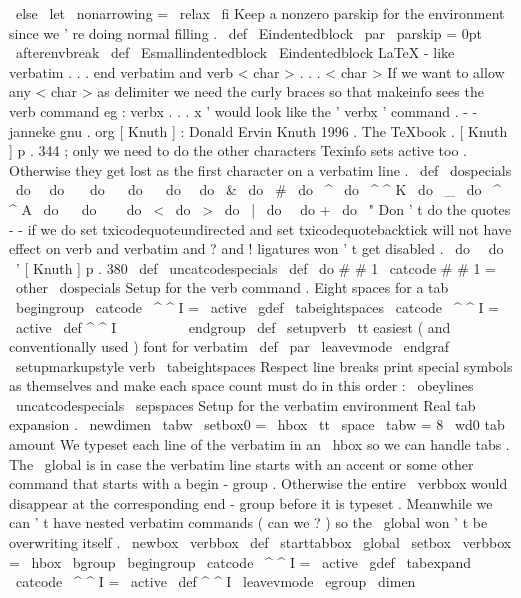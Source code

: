 {{{{{\
else
\
let
\
nonarrowing
=
\
relax
\
fi
}
%
Keep
a
nonzero
parskip
for
the
environment
since
we
'
re
doing
normal
filling
.
%
\
def
\
Eindentedblock
{
%
\
par
{
\
parskip
=
0pt
\
afterenvbreak
}
%
}
\
def
\
Esmallindentedblock
{
\
Eindentedblock
}
%
LaTeX
-
like
verbatim
.
.
.
end
verbatim
and
verb
{
<
char
>
.
.
.
<
char
>
}
%
If
we
want
to
allow
any
<
char
>
as
delimiter
%
we
need
the
curly
braces
so
that
makeinfo
sees
the
verb
command
eg
:
%
verbx
.
.
.
x
'
would
look
like
the
'
verbx
'
command
.
-
-
janneke
gnu
.
org
%
%
[
Knuth
]
:
Donald
Ervin
Knuth
1996
.
The
TeXbook
.
%
%
[
Knuth
]
p
.
344
;
only
we
need
to
do
the
other
characters
Texinfo
sets
%
active
too
.
Otherwise
they
get
lost
as
the
first
character
on
a
%
verbatim
line
.
\
def
\
dospecials
{
%
\
do
\
\
do
\
\
\
do
\
{
\
do
\
}
\
do
\
\
do
\
&
%
\
do
\
#
\
do
\
^
\
do
\
^
^
K
\
do
\
_
\
do
\
^
^
A
\
do
\
%
\
do
\
~
%
\
do
\
<
\
do
\
>
\
do
\
|
\
do
\
\
do
+
\
do
\
"
%
%
Don
'
t
do
the
quotes
-
-
if
we
do
set
txicodequoteundirected
and
%
set
txicodequotebacktick
will
not
have
effect
on
verb
and
%
verbatim
and
?
and
!
ligatures
won
'
t
get
disabled
.
%
\
do
\
\
do
\
'
%
}
%
%
[
Knuth
]
p
.
380
\
def
\
uncatcodespecials
{
%
\
def
\
do
#
#
1
{
\
catcode
#
#
1
=
\
other
}
\
dospecials
}
%
%
Setup
for
the
verb
command
.
%
%
Eight
spaces
for
a
tab
\
begingroup
\
catcode
\
^
^
I
=
\
active
\
gdef
\
tabeightspaces
{
\
catcode
\
^
^
I
=
\
active
\
def
^
^
I
{
\
\
\
\
\
\
\
\
}
}
\
endgroup
%
\
def
\
setupverb
{
%
\
tt
%
easiest
(
and
conventionally
used
)
font
for
verbatim
\
def
\
par
{
\
leavevmode
\
endgraf
}
%
\
setupmarkupstyle
{
verb
}
%
\
tabeightspaces
%
Respect
line
breaks
%
print
special
symbols
as
themselves
and
%
make
each
space
count
%
must
do
in
this
order
:
\
obeylines
\
uncatcodespecials
\
sepspaces
}
%
Setup
for
the
verbatim
environment
%
%
Real
tab
expansion
.
\
newdimen
\
tabw
\
setbox0
=
\
hbox
{
\
tt
\
space
}
\
tabw
=
8
\
wd0
%
tab
amount
%
%
We
typeset
each
line
of
the
verbatim
in
an
\
hbox
so
we
can
handle
%
tabs
.
The
\
global
is
in
case
the
verbatim
line
starts
with
an
accent
%
or
some
other
command
that
starts
with
a
begin
-
group
.
Otherwise
the
%
entire
\
verbbox
would
disappear
at
the
corresponding
end
-
group
before
%
it
is
typeset
.
Meanwhile
we
can
'
t
have
nested
verbatim
commands
%
(
can
we
?
)
so
the
\
global
won
'
t
be
overwriting
itself
.
\
newbox
\
verbbox
\
def
\
starttabbox
{
\
global
\
setbox
\
verbbox
=
\
hbox
\
bgroup
}
%
\
begingroup
\
catcode
\
^
^
I
=
\
active
\
gdef
\
tabexpand
{
%
\
catcode
\
^
^
I
=
\
active
\
def
^
^
I
{
\
leavevmode
\
egroup
\
dimen
}}}}}}
